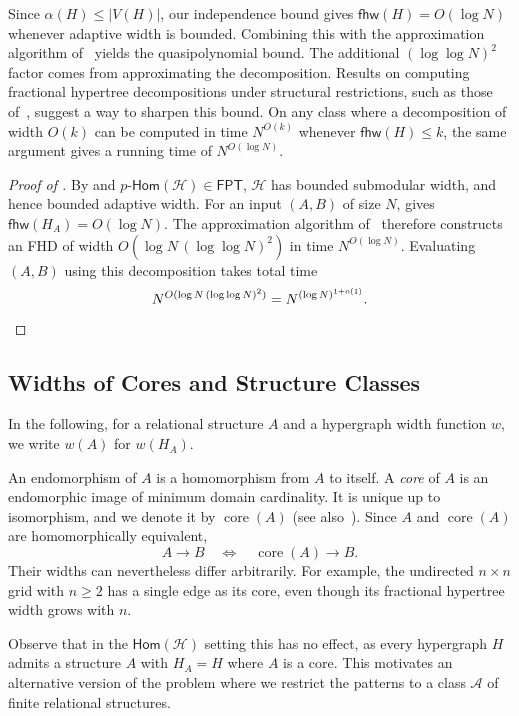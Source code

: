 \documentclass[11pt,letterpaper]{article}
\theoremstyle{definition}
\theoremstyle{remark}
\newcommand{\cH}{\mathcal H}
\newcommand{\cA}{\mathcal A}
\newcommand{\Hom}{\mathsf{Hom}}
\newcommand{\pHom}{p\text{-}\mathsf{Hom}}
\newcommand{\fhw}{\mathsf{fhw}}
\newcommand{\FPT}{\ensuremath{\mathsf{FPT}}}
\providecommand{\fhw}{\operatorname{fhw}}
\providecommand{\FPT}{\ensuremath{\mathsf{FPT}}}
\begin{document}
Since $\alpha(H)\le |V(H)|$, our independence bound gives $\fhw(H)=O(\log N)$ whenever adaptive width is bounded. Combining this with the approximation algorithm of~\cite{KorchemnaEtAl2024} yields the quasipolynomial bound. The additional $(\log\log N)^2$ factor comes from approximating the decomposition. Results on computing fractional hypertree decompositions under structural restrictions, such as those of~\cite{DBLP:journals/jacm/GottlobLPR21}, suggest a way to sharpen this bound. On any class where a decomposition of width $O(k)$ can be computed in time $N^{O(k)}$ whenever $\fhw(H)\le k$, the same argument gives a running time of $N^{O(\log N)}$.
\begin{proof}[Proof of ]
By  and $\pHom(\cH)\in\FPT$, $\cH$ has bounded submodular
width, and hence bounded adaptive width.
For an input $(A,B)$ of size $N$,  gives
$\fhw(H_A)=O(\log N)$.
The approximation algorithm of~\cite[Theorem~1.2]{KorchemnaEtAl2024}
therefore constructs an FHD of width $O(\log N\,(\log\log N)^2)$
in time $N^{O(\log N)}$.
Evaluating $(A,B)$ using this decomposition takes total time
\[
 N^{O(\log N\,(\log\log N)^2)}=N^{(\log N)^{1+o(1)}}.\qedhere
\]
\end{proof}

\subsection{Widths of Cores and Structure Classes}
In the following, for a relational structure $A$ and a hypergraph width function $w$,
we write $w(A)$ for $w(H_A)$.

An endomorphism of $A$ is a homomorphism from $A$ to itself.
A \emph{core} of $A$ is an endomorphic image of minimum domain
cardinality. It is unique up to isomorphism, and we denote it by
$\operatorname{core}(A)$ (see also~\cite{ChandraMerlin77}).
Since $A$ and $\operatorname{core}(A)$ are homomorphically equivalent,
\[
 A\to B \quad\Longleftrightarrow\quad \operatorname{core}(A)\to B.
\]
Their widths can nevertheless differ arbitrarily. For example, the
undirected $n\times n$ grid with $n\ge2$ has a single edge as its core, even though its
fractional hypertree width grows with $n$.

Observe that in the $\Hom(\cH)$ setting this has no effect, as every hypergraph $H$ admits a structure $A$ with $H_A=H$ where $A$ is a core. This motivates an alternative version of the problem where we restrict the patterns to a class $\cA$ of finite relational structures.
\end{document}
